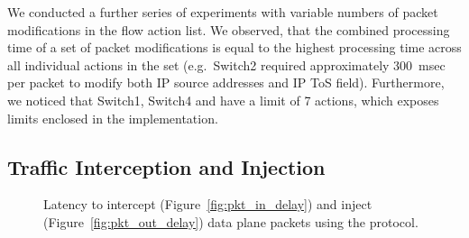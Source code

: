 We conducted a further series of experiments with variable numbers of packet
modifications in the flow action list. We observed, that the combined processing
time of a set of packet modifications is equal to the highest processing time
across all individual actions in the set (e.g.~Switch2 required approximately
300~msec per packet to modify both IP source addresses and IP ToS field).
Furthermore, we noticed that Switch1, Switch4 and \ovs have a limit of 7
actions, which exposes limits enclosed in the implementation.


\subsection{Traffic Interception and Injection}\label{sec:results-pktin}

\begin{figure}[t]
  \begin{center}
  \end{center}
  \caption[\texttt{pkt\_in} and \texttt{pkt\_out} processing latency]{Latency to
    intercept (Figure~\ref{fig:pkt_in_delay}) and inject
    (Figure~\ref{fig:pkt_out_delay}) data plane packets using the \of protocol.}
  \label{fig:pkt_in_out_delay}
\end{figure}

